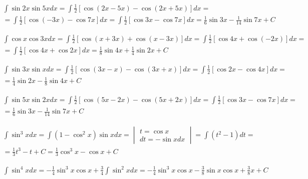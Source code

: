 
\begin{gather*}\int \sin 2x \sin 5x dx = \int \frac{1}{2}[\cos (2x-5x) - \cos(2x+5x)]dx =  \\
= \int \frac{1}{2}[\cos(-3x)-\cos 7x]dx = \int \frac{1}{2}[\cos 3x - \cos 7x]dx = \frac{1}{6}\sin 3x - \frac{1}{14}\sin 7x + C\end{gather*}



\begin{gather*}\int \cos x \cos 3x dx = \int \frac{1}{2}[\cos(x+3x)+\cos(x-3x)]dx = \int \frac{1}{2}[\cos 4x + \cos (-2x)]dx =  \\
= \int \frac{1}{2}[\cos 4x + \cos 2x]dx = \frac{1}{8}\sin 4x + \frac{1}{4} \sin 2x + C\end{gather*}



\begin{gather*}\int \sin 3x \sin x dx = \int \frac{1}{2}[\cos (3x-x) - \cos(3x+x)]dx = \int \frac{1}{2}[\cos 2x -\cos 4x]dx =  \\
= \frac{1}{4}\sin 2x - \frac{1}{8}\sin 4x + C\end{gather*}



\begin{gather*}\int \sin 5x \sin 2x dx = \int \frac{1}{2}[\cos (5x-2x) - \cos(5x+2x)]dx = \int \frac{1}{2}[\cos 3x -\cos 7x]dx =  \\
= \frac{1}{6}\sin 3x - \frac{1}{14}\sin 7x + C\end{gather*}



\begin{gather*}\int \sin^3 x dx = \int (1-\cos^2x)\sin x dx = \begin{vmatrix} t=\cos x \\ dt=-\sin x dx \end{vmatrix} = \int (t^2-1)dt =  \\
= \frac{1}{3}t^3-t+C = \frac{1}{3}\cos^3 x - \cos x+C\end{gather*}



\begin{gather*}\int \sin^4 x dx = -\frac{1}{4}\sin^3 x \cos x + \frac{3}{4}\int \sin^2 x dx = -\frac{1}{4}\sin^3 x \cos x - \frac{3}{8}\sin x \cos x + \frac{3}{8}x + C \end{gather*}

